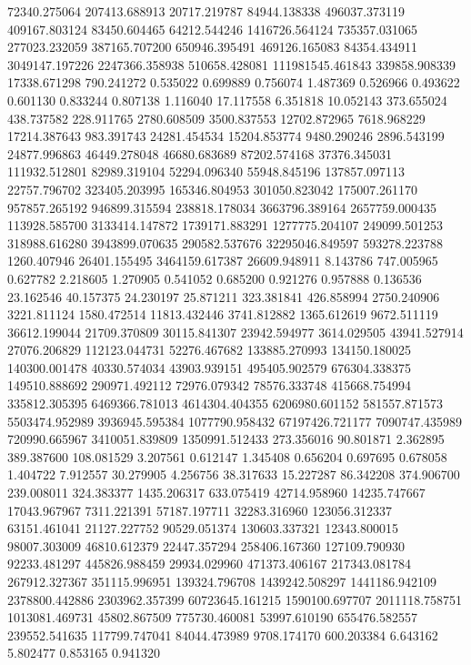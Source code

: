 72340.275064
207413.688913
20717.219787
84944.138338
496037.373119
409167.803124
83450.604465
64212.544246
1416726.564124
735357.031065
277023.232059
387165.707200
650946.395491
469126.165083
84354.434911
3049147.197226
2247366.358938
510658.428081
111981545.461843
339858.908339
17338.671298
790.241272
0.535022
0.699889
0.756074
1.487369
0.526966
0.493622
0.601130
0.833244
0.807138
1.116040
17.117558
6.351818
10.052143
373.655024
438.737582
228.911765
2780.608509
3500.837553
12702.872965
7618.968229
17214.387643
983.391743
24281.454534
15204.853774
9480.290246
2896.543199
24877.996863
46449.278048
46680.683689
87202.574168
37376.345031
111932.512801
82989.319104
52294.096340
55948.845196
137857.097113
22757.796702
323405.203995
165346.804953
301050.823042
175007.261170
957857.265192
946899.315594
238818.178034
3663796.389164
2657759.000435
113928.585700
3133414.147872
1739171.883291
1277775.204107
249099.501253
318988.616280
3943899.070635
290582.537676
32295046.849597
593278.223788
1260.407946
26401.155495
3464159.617387
26609.948911
8.143786
747.005965
0.627782
2.218605
1.270905
0.541052
0.685200
0.921276
0.957888
0.136536
23.162546
40.157375
24.230197
25.871211
323.381841
426.858994
2750.240906
3221.811124
1580.472514
11813.432446
3741.812882
1365.612619
9672.511119
36612.199044
21709.370809
30115.841307
23942.594977
3614.029505
43941.527914
27076.206829
112123.044731
52276.467682
133885.270993
134150.180025
140300.001478
40330.574034
43903.939151
495405.902579
676304.338375
149510.888692
290971.492112
72976.079342
78576.333748
415668.754994
335812.305395
6469366.781013
4614304.404355
6206980.601152
581557.871573
5503474.952989
3936945.595384
1077790.958432
67197426.721177
7090747.435989
720990.665967
3410051.839809
1350991.512433
273.356016
90.801871
2.362895
389.387600
108.081529
3.207561
0.612147
1.345408
0.656204
0.697695
0.678058
1.404722
7.912557
30.279905
4.256756
38.317633
15.227287
86.342208
374.906700
239.008011
324.383377
1435.206317
633.075419
42714.958960
14235.747667
17043.967967
7311.221391
57187.197711
32283.316960
123056.312337
63151.461041
21127.227752
90529.051374
130603.337321
12343.800015
98007.303009
46810.612379
22447.357294
258406.167360
127109.790930
92233.481297
445826.988459
29934.029960
471373.406167
217343.081784
267912.327367
351115.996951
139324.796708
1439242.508297
1441186.942109
2378800.442886
2303962.357399
60723645.161215
1590100.697707
2011118.758751
1013081.469731
45802.867509
775730.460081
53997.610190
655476.582557
239552.541635
117799.747041
84044.473989
9708.174170
600.203384
6.643162
5.802477
0.853165
0.941320
